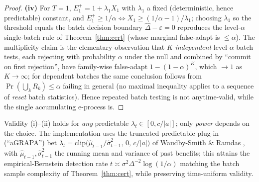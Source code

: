 \begin{proof}
\textbf{(iv)} For $T=1$, $E_1^{+}=1+\lambda_1 X_1$ with $\lambda_1$ a fixed
(deterministic, hence predictable) constant, and $E_1^{+}\ge1/\alpha\iff
X_1\ge(1/\alpha-1)/\lambda_1$; choosing $\lambda_1$ so the threshold equals the
batch decision boundary $\hat\Delta-\varepsilon=0$ reproduces the level-$\alpha$
single-batch rule of Theorem~\ref{thm:cert} (whose marginal false-adapt is
$\le\alpha$). The multiplicity claim is the elementary observation that $K$
\emph{independent} level-$\alpha$ batch tests, each rejecting with probability
$\alpha$ under the null and combined by ``commit on first rejection'', have
family-wise false-adapt $1-(1-\alpha)^K$, which $\to1$ as $K\to\infty$; for
dependent batches the same conclusion follows from $\Pr(\bigcup_k R_k)\le\alpha$
failing in general (no maximal inequality applies to a sequence of \emph{reset}
batch statistics). Hence repeated batch testing is not anytime-valid, while the
single accumulating e-process is. \qedhere
\end{proof}

\begin{remark}\label{rmk:bet}
Validity (i)--(ii) holds for \emph{any} predictable $\lambda_t\in[0,c/|a|]$; only
\emph{power} depends on the choice. The implementation uses the truncated
predictable plug-in (``aGRAPA'') bet
$\lambda_t=\mathrm{clip}\!\big(\hat\mu_{t-1}/\hat\sigma^2_{t-1},\,0,\,c/|a|\big)$
of Waudby-Smith \& Ramdas \cite{waudbysmith2024betting}, with $\hat\mu_{t-1},
\hat\sigma^2_{t-1}$ the running mean and variance of past benefits; this attains
the empirical-Bernstein detection rate $t\asymp\sigma^2\Delta^{-2}\log(1/\alpha)$
matching the batch sample complexity of Theorem~\ref{thm:cert}, while preserving
time-uniform validity.
\end{remark}


